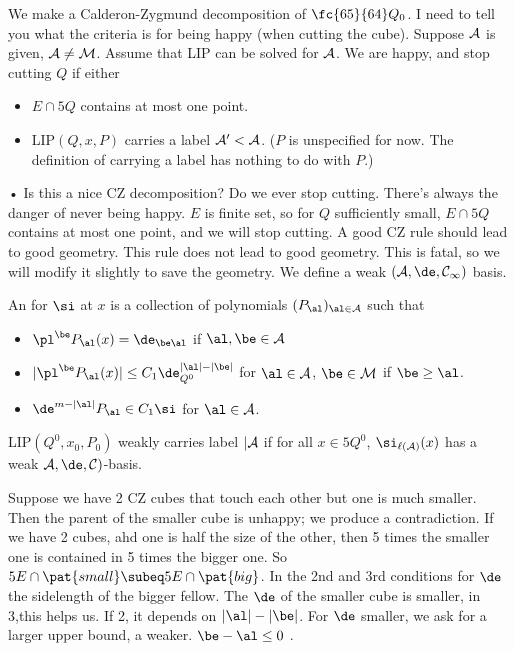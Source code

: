 We make a Calderon-Zygmund decomposition of $\fc{65}{64}Q_0$. I need to tell you what the criteria is for being happy (when cutting the cube).
Suppose $\cal A$ is given, $\cal A\ne \cal M$. Assume that LIP can be solved for $\cal A$. 
We are happy, and stop cutting $Q$ if either 
\begin{itemize}
\item
$E\cap 5Q$ contains at most one point.
\item
LIP$(Q,x,P)$ carries a label $\cal A'<\cal A$. ($P$ is unspecified for now. The definition of carrying a label has nothing to do with $P$.)
\end{itemize}•
Is this a nice CZ decomposition? Do we ever stop cutting. There's always the danger of never being happy. $E$ is finite set, so for $Q$ sufficiently small, $E\cap 5Q$ contains at most one point, and we will stop cutting. %
A good CZ rule should lead to good geometry. This rule does not lead to good geometry. %
This is fatal, so we will modify it slightly to save the geometry. We define a weak $(\cal A,\de,C_1)$ basis.
\begin{df}%
An  for $\si$ at $x$ is a collection of polynomials $(P_\al)_{\al\in \cal A}$ such that 
\begin{itemize}
\item
$\pl^\be P_\al(x)=\de_{\be \al}$ if $\al,\be\in \cal A$
\item
$|\pl^\be P_\al(x)|\le C_1 \de_{Q^0}^{|\al|-|\be|}$ for $\al\in \cal A$, $\be \in \cal M$ if $\be \ge \al$.
\item
$\de^{m-|\al|}P_\al \in C_1\si$ for $\al\in \cal A$. 
\end{itemize}
LIP$(Q^0,x_0,P_0)$ weakly carries label $|\cal A$ if for all $x\in 5Q^0$, $\si_{\ell(\cal A)}(x)$ has a weak $\cal A,\de,C)$-basis. 
\end{df}
Suppose we have 2 CZ cubes that touch each other but one is much smaller. Then the parent of the smaller cube is unhappy; we produce a contradiction.
If we have 2 cubes, ahd one is half the size of the other, then 5 times the smaller one is contained in 5 times the bigger one.
So $5E\cap \pat{small}\subeq 5 E \cap \pat{big}$. In the 2nd and 3rd conditions for $\de$ the sidelength of the bigger fellow.
The $\de$ of the smaller cube is smaller,  in 3,this helps us. %
If 2, it depends on $|\al|-|\be|$. For $\de$ smaller, we ask for a larger upper bound, a weaker. $\be - \al\le 0$ . %

